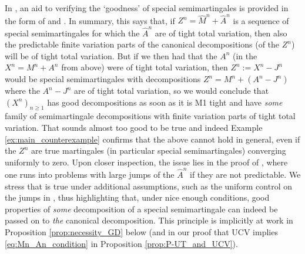 \documentclass[11pt]{article}
\theoremstyle{definition}\newtheorem{example}[theorem]{Example}
\theoremstyle{definition}\newtheorem{counterexample}[theorem]{Counterexample}
\theoremstyle{definition}\newtheorem{remark}[theorem]{Remark}
\theoremstyle{definition}\newtheorem{defi}[theorem]{Definition}
\numberwithin{equation}{section}
\renewcommand{\|}{\; : \, \;}											%
\begin{document}
In \cite{duffie_protter}, an aid to verifying the `goodness' of special semimartingales is provided in the form of \cite[Lem.~4.1]{duffie_protter} and \cite[App.~B]{duffie_protter}. In summary, this says that, if $Z^n=\hat{M}^n+\hat{A}^n$ is a sequence of special semimartingales for which the $\hat{A}^n$ are of tight total variation, then also the predictable finite variation parts of the canonical decompositions (of the $Z^n$) will be of tight total variation. But if we then had that the $A^n$ (in the $X^n=M^n+A^n$ from above) were of tight total variation, then $Z^n:=X^n-J^n$ would be special semimartingales with decompositions $Z^n=M^n+(A^n-J^n)$ where the $A^n-J^n$ are of tight total variation, so we would conclude that $(X^n)_{n\geq1}$ has good decompositions as soon as it is M1 tight and have \emph{some} family of semimartingale decompositions with finite variation parts of tight total variation. That sounds almost too good to be true and indeed Example \ref{ex:main_counterexample} confirms that the above cannot hold in general, even if the $Z^n$ are true martingales (in particular special semimartingales) converging uniformly to zero. Upon closer inspection, the issue lies in the proof of \cite[Cor.~B1]{duffie_protter}, where one runs into problems with large jumps of the $\hat{A}^n$ if they are not predictable. We stress that \cite[Lem.~4.1]{duffie_protter} is true under additional assumptions, such as the uniform control on the jumps in \cite[Lem.~B1]{duffie_protter}, thus highlighting that, under nice enough conditions, good properties of \emph{some} decomposition of a special semimartingale can indeed be passed on to \emph{the} canonical decomposition. This principle is implicitly at work in Proposition \ref{prop:necessity_GD} below (and in our proof that UCV implies \eqref{eq:Mn_An_condition} in Proposition \ref{prop:P-UT_and_UCV}).
\end{document}
